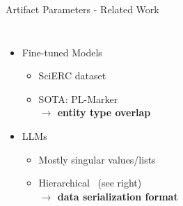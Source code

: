 \documentclass[en,16:9,smallfoot]{sdqbeamer}
\begin{document}
   \begin{frame}{Artifact Parameters - Related Work}
   \begin{columns}
           \begin{itemize}
               \item Fine-tuned Models
                   \begin{itemize}
                       \item SciERC dataset~\cite{luan2018scierc} %
                       \item SOTA: PL-Marker~\cite{Ye2022}\\\textbf{$\rightarrow$ entity type overlap}
                   \end{itemize}
               \item LLMs
                   \begin{itemize}
                       \item Mostly singular values/lists~\cite{Agrawal2022,Xie2023,Polak2023}
                       \item Hierarchical~\cite{Dunn2022} (see right)\\\textbf{$\rightarrow$ data serialization format}
                   \end{itemize}
           \end{itemize}
           \begin{overlayarea}{\textwidth}{4em}
\end{overlayarea}
\end{columns}
\end{frame}
\end{document}
